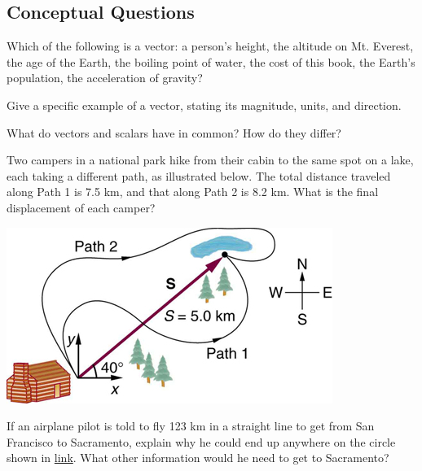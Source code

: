 \documentclass[
]{book}
\newenvironment{conceptual-questions}{}{}
\begin{document}
\hypertarget{fs-id1165299003649}{}
\begin{conceptual-questions}

\hypertarget{conceptual-questions-7}{%
\subsection{Conceptual Questions}\label{conceptual-questions-7}}

\hypertarget{fs-id1165298732767}{}
\leavevmode\hypertarget{fs-id1165298730553}{}%
Which of the following is a vector: a person's height, the altitude on
Mt. Everest, the age of the Earth, the boiling point of water, the cost
of this book, the Earth's population, the acceleration of gravity?

\hypertarget{fs-id1165298775836}{}
\leavevmode\hypertarget{fs-id1165298806849}{}%
Give a specific example of a vector, stating its magnitude, units, and
direction.

\hypertarget{fs-id1165298783616}{}
\leavevmode\hypertarget{fs-id1165298725379}{}%
What do vectors and scalars have in common? How do they differ?

\hypertarget{fs-id1165296576944}{}
\leavevmode\hypertarget{fs-id1165298861181}{}%
Two campers in a national park hike from their cabin to the same spot on
a lake, each taking a different path, as illustrated below. The total
distance traveled along Path 1 is 7.5 km, and that along Path 2 is 8.2
km. What is the final displacement of each camper?

\includegraphics{images/Figure_03_02_18a.jpg}

\hypertarget{fs-id1165298981819}{}
\leavevmode\hypertarget{fs-id1165298981820}{}%
If an airplane pilot is told to fly 123 km in a straight line to get
from San Francisco to Sacramento, explain why he could end up anywhere
on the circle shown in
\protect\hyperlink{import-auto-id1165296384452}{link}. What other
information would he need to get to Sacramento?


\end{conceptual-questions}
\end{document}
